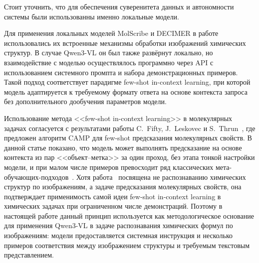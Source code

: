 Стоит уточнить, что для обеспечения суверенитета данных и автономности системы были использованны именно локальные модели.

Для применения локальных моделей MolScribe и DECIMER в работе использовались их встроенные механизмы обработки изображений химических структур. В случае Qwen3-VL он был также развёрнут локально, но взаимодействие с моделью осуществлялось программно через API с использованием системного промпта и набора демонстрационных примеров. Такой подход соответствует парадигме few-shot in-context learning, при которой модель адаптируется к требуемому формату ответа на основе контекста запроса без дополнительного дообучения параметров модели.

Использование метода <<few-shot in-context learning>> в молекулярных задачах согласуется с результатами работы C.~Fifty, J.~Leskovec и S.~Thrun~\cite{refCAMP}, где предложен алгоритм CAMP для few-shot предсказания молекулярных свойств. В данной статье показано, что модель может выполнять предсказание на основе контекста из пар <<объект--метка>> за один проход, без этапа тонкой настройки модели, и при малом числе примеров превосходит ряд классических мета-обучающих-подходов~\cite{refCAMP}. Хотя работа~\cite{refCAMP} посвящена не распознаванию химических структур по изображениям, а задаче предсказания молекулярных свойств, она подтверждает применимость самой идеи few-shot in-context learning в химических задачах при ограниченном числе демонстраций. Поэтому в настоящей работе данный принцип используется как методологическое основание для применения Qwen3-VL в задаче распознавания химических формул по изображениям: модели предоставляется системная инструкция и несколько примеров соответствия между изображением структуры и требуемым текстовым представлением.
